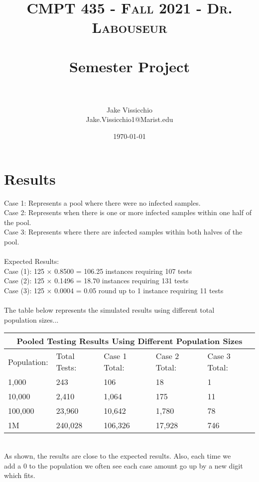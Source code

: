 \documentclass[letterpaper, 10pt]{article}
\title{	
   \normalfont\normalsize 
   \textsc{CMPT 435 - Fall 2021 - Dr. Labouseur} \\[10pt] %
   \horrule{0.5pt} \\[0.25cm] 	%
   \huge Semester Project \\   %
   \horrule{0.5pt} \\[0.25cm] 	%
}
\author{Jake Vissicchio \\ \normalsize Jake.Vissicchio1@Marist.edu}
\date{\normalsize\today} 	%
\begin{document}
\maketitle %



\section{Results}
\noindent
Case 1: Represents a pool where there were no infected samples. \\
Case 2: Represents when there is one or more infected samples within one half of the pool.\\
Case 3: Represents where there are infected samples within both halves of the pool.\\
\\
Expected Results: \\
Case (1): 125 × 0.8500 = 106.25 instances requiring 107 tests \\
Case (2): 125 × 0.1496 = 18.70 instances requiring 131 tests \\
Case (3): 125 × 0.0004 = 0.05 round up to 1 instance requiring 11 tests \\
\\
\noindent
The table below represents the simulated results using different total\\ population sizes...\\

\begin{tabular}{ |p{2cm}||p{2cm}|p{2cm}|p{2cm}|p{2cm} |}
 \hline
 \multicolumn{5}{|c|}{Pooled Testing Results Using Different Population Sizes} \\
 \hline
 Population: & Total Tests: & Case 1 Total: & Case 2 Total: & Case 3 Total: \\
 \hline
1,000   &  243    &  106 & 18 & 1\\
10,000 & 2,410 & 1,064 & 175 & 11   \\
100,000 & 23,960 & 10,642 & 1,780 & 78 \\
1M & 240,028 & 106,326 & 17,928 & 746 \\
 \hline
\end{tabular}
\\
As shown, the results are close to the expected results. Also, each time we\\
add a 0 to the population we often see each case amount go up by a new digit\\
which fits.\\
\end{document}

